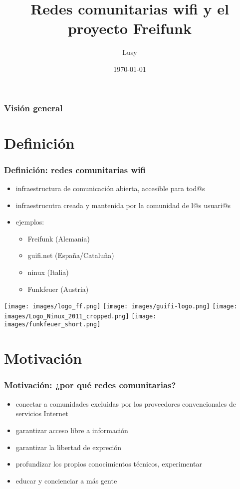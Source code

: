 \documentclass[12pt, xcolor=table]{beamer}
\begin{document}
\title{Redes comunitarias wifi y el proyecto Freifunk}
\author{Lusy}
\date{\today}


\begin{frame}
    \titlepage
\end{frame}

\begin{frame}
    \frametitle{Visión general}
    \tableofcontents
\end{frame}

\section{Definición}
\begin{frame}
  \frametitle{Definición: redes comunitarias wifi}
    \begin{itemize}
      \item infraestructura de comunicación abierta, accesible para tod@s
      \item infraestrucutra creada y mantenida por la comunidad de l@s usuari@s
      \item ejemplos:
        \begin{itemize}
          \item Freifunk (Alemania)
          \item guifi.net (España/Cataluña)
          \item ninux (Italia)
          \item Funkfeuer (Austria)
        \end{itemize}
    \end{itemize}
    \texttt{[image: images/logo\_ff.png]}
    \hspace{6pt}
    \texttt{[image: images/guifi-logo.png]}
    \hspace{6pt}
    \texttt{[image: images/Logo\_Ninux\_2011\_cropped.png]}
    \hspace{6pt}
    \texttt{[image: images/funkfeuer\_short.png]}
\end{frame}

\section{Motivación}
\begin{frame}
  \frametitle{Motivación: ¿por qué redes comunitarias?}
  \begin{itemize}
    \item conectar a comunidades excluidas por los proveedores convencionales de servicios Internet
    \item garantizar acceso libre a información
    \item garantizar la libertad de expreción
    \item profundizar los propios conocimientos técnicos, experimentar
    \item educar y concienciar a más gente
  \end{itemize}
\end{frame}
\end{document}
